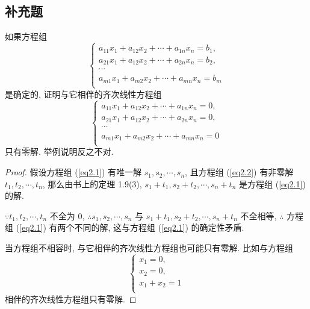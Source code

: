 \documentclass[color=black,device=normal,lang=cn,mode=geye]{elegantnote}
\begin{document}
\subsection{补充题}
\begin{exercisec}[1.10]\label{exc1.10}
    如果方程组
    \begin{equation}\label{eq2.1}
        \begin{cases}
            a_{11}x_1+a_{12}x_2+\cdots+a_{1n}x_n=b_1, \\
            a_{21}x_1+a_{12}x_2+\cdots+a_{2n}x_n=b_2, \\
            \cdots \\
            a_{m1}x_1+a_{m2}x_2+\cdots+a_{mn}x_n=b_m \\
        \end{cases}
    \end{equation}
    是确定的, 证明与它相伴的齐次线性方程组
    \begin{equation}\label{eq2.2}
        \begin{cases}
            a_{11}x_1+a_{12}x_2+\cdots+a_{1n}x_n=0, \\
            a_{21}x_1+a_{12}x_2+\cdots+a_{2n}x_n=0, \\
            \cdots \\
            a_{m1}x_1+a_{m2}x_2+\cdots+a_{mn}x_n=0 \\
        \end{cases}
    \end{equation}
    只有零解. 举例说明反之不对.
\end{exercisec}
\begin{proof}
    假设方程组 (\ref{eq2.1}) 有唯一解 $s_1,s_2,\cdots,s_n$, 且方程组 (\ref{eq2.2}) 有非零解 $t_1,t_2,\cdots,t_n$, 那么由书上的定理 1.9(3), $s_1+t_1,s_2+t_2,\cdots,s_n+t_n$ 是方程组 (\ref{eq2.1}) 的解.
    
    $\because t_1,t_2,\cdots,t_n$ 不全为 $0$, $\therefore s_1,s_2,\cdots,s_n$ 与 $s_1+t_1,s_2+t_2,\cdots,s_n+t_n$ 不全相等, $\therefore$ 方程组 (\ref{eq2.1}) 有两个不同的解, 这与方程组 (\ref{eq2.1}) 的确定性矛盾.

    当方程组不相容时, 与它相伴的齐次线性方程组也可能只有零解. 比如与方程组
    \[\begin{cases}
        x_1=0, \\
        x_2=0, \\
        x_1+x_2=1 \\
    \end{cases}\]
    相伴的齐次线性方程组只有零解.
\end{proof}
\end{document}
